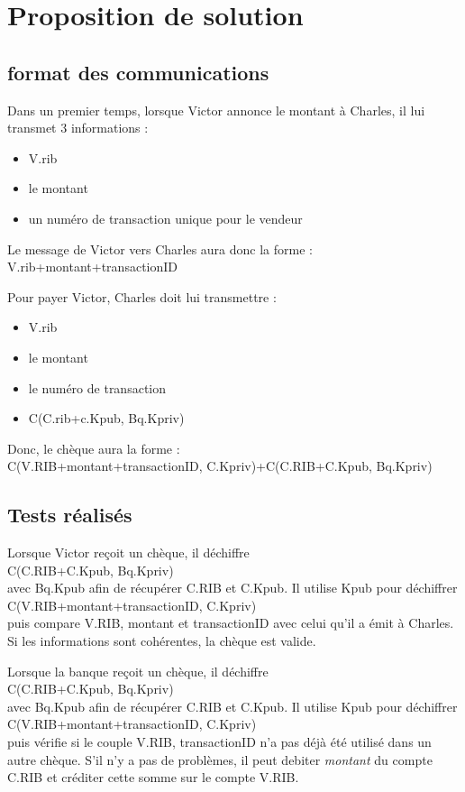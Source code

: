 \documentclass[oneside,10pt]{article}
\begin{document}
\section{Proposition de solution}
\subsection{format des communications}
Dans un premier temps, lorsque Victor annonce le montant \`a Charles, il lui transmet 3 informations :
\begin{itemize}
\item V.rib
\item le montant
\item un num\'ero de transaction unique pour le vendeur
\end{itemize}
Le message de Victor vers Charles aura donc la forme :\\V.rib+montant+transactionID


Pour payer Victor, Charles doit lui transmettre :
\begin{itemize}
\item V.rib
\item le montant
\item le num\'ero de transaction
\item C(C.rib+c.Kpub, Bq.Kpriv)
\end{itemize}
Donc, le ch\`eque aura la forme : \\C(V.RIB+montant+transactionID, C.Kpriv)+C(C.RIB+C.Kpub, Bq.Kpriv)
\subsection{Tests r\'ealis\'es}
Lorsque Victor re\c coit un ch\`eque, il d\'echiffre \\C(C.RIB+C.Kpub, Bq.Kpriv)\\avec Bq.Kpub afin de r\'ecup\'erer C.RIB et C.Kpub.
Il utilise Kpub pour d\'echiffrer \\C(V.RIB+montant+transactionID, C.Kpriv)\\puis compare V.RIB, montant et transactionID avec celui qu'il a \'emit \`a Charles.
Si les informations sont coh\'erentes, la ch\`eque est valide.


Lorsque la banque re\c coit un ch\`eque, il d\'echiffre \\C(C.RIB+C.Kpub, Bq.Kpriv)\\avec Bq.Kpub afin de r\'ecup\'erer C.RIB et C.Kpub.
Il utilise Kpub pour d\'echiffrer \\C(V.RIB+montant+transactionID, C.Kpriv)\\puis v\'erifie si le couple V.RIB, transactionID n'a pas d\'ej\`a \'et\'e utilis\'e dans un autre ch\`eque.
S'il n'y a pas de probl\`emes, il peut debiter \textit{montant} du compte C.RIB et cr\'editer cette somme sur le compte V.RIB.
\end{document}
